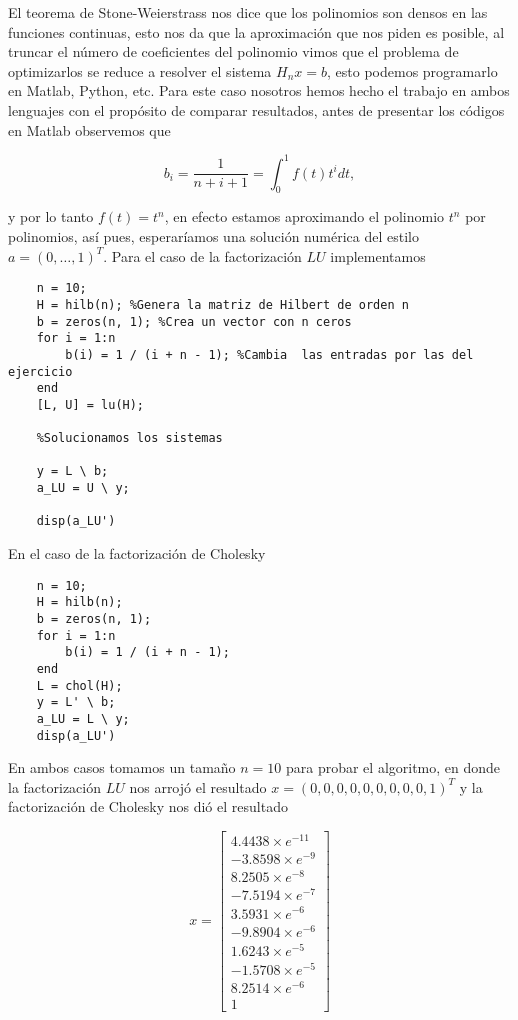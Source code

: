 \begin{enumerate}
    \begin{solution}
    El teorema de Stone-Weierstrass nos dice que los polinomios son densos en las funciones continuas, esto nos da que la aproximación que nos piden es posible, al truncar el número de coeficientes del polinomio vimos que el problema de optimizarlos se reduce a resolver el sistema $H_nx=b$, esto podemos programarlo en Matlab, Python, etc. Para este caso nosotros hemos hecho el trabajo en ambos lenguajes con el propósito de comparar resultados, antes de presentar los códigos en Matlab observemos que

    $$b_i=\dfrac{1}{n+i+1}=\int_0^1f(t)t^i dt,$$

    y por lo tanto $f(t)=t^n$, en efecto estamos aproximando el polinomio $t^n$ por polinomios, así pues, esperaríamos una solución numérica del estilo $a=(0,\ldots,1)^T$. Para el caso de la factorización $LU$ implementamos

    \begin{lstlisting}
    n = 10; 
    H = hilb(n); %Genera la matriz de Hilbert de orden n
    b = zeros(n, 1); %Crea un vector con n ceros 
    for i = 1:n
        b(i) = 1 / (i + n - 1); %Cambia  las entradas por las del ejercicio
    end
    [L, U] = lu(H);

    %Solucionamos los sistemas

    y = L \ b;
    a_LU = U \ y;

    disp(a_LU')
    \end{lstlisting}

    En el caso de la factorización de Cholesky

    \begin{lstlisting}
    n = 10; 
    H = hilb(n); 
    b = zeros(n, 1); 
    for i = 1:n
        b(i) = 1 / (i + n - 1); 
    end
    L = chol(H); 
    y = L' \ b;
    a_LU = L \ y;
    disp(a_LU')
    \end{lstlisting}

    En ambos casos tomamos un tamaño $n=10$ para probar el algoritmo, en donde la factorización $LU$ nos arrojó el resultado $x=(0,0,0,0,0,0,0,0,0,1)^T$ y la factorización de Cholesky nos dió el resultado 

   \[x=
\begin{bmatrix}
4.4438 \times e^{-11} \\
-3.8598 \times e^{-9} \\
8.2505 \times e^{-8} \\
-7.5194 \times e^{-7} \\
3.5931 \times e^{-6} \\
-9.8904 \times e^{-6} \\
1.6243 \times e^{-5} \\
-1.5708 \times e^{-5} \\
8.2514 \times e^{-6} \\
1
\end{bmatrix}
\]
    \end{solution}


\end{enumerate}

